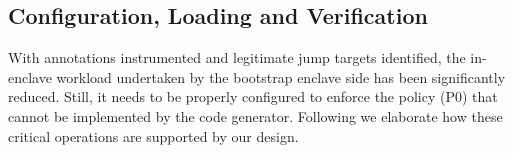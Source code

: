 




\subsection{Configuration, Loading and Verification}
\label{subsec:verify}

With annotations instrumented and legitimate jump targets identified, the in-enclave workload undertaken by the bootstrap enclave side has been significantly reduced. Still, it needs to be properly configured to enforce the policy (P0) that cannot be implemented by the code generator.
Following we elaborate how these critical operations are supported by our design.




